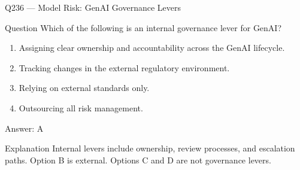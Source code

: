 \documentclass[aspectratio=169,8pt]{beamer}
\begin{document}
																																											\begin{frame}{Q236 --- Model Risk: GenAI Governance Levers}
																																												\begin{block}{Question}
																																													Which of the following is an internal governance lever for GenAI?
																																													\begin{enumerate}
																																														\item Assigning clear ownership and accountability across the GenAI lifecycle.
																																														\item Tracking changes in the external regulatory environment.
																																														\item Relying on external standards only.
																																														\item Outsourcing all risk management.
																																													\end{enumerate}  \end{block}
																																													\begin{exampleblock}{Answer: A}\end{exampleblock}
																																													\begin{block}{Explanation}
																																														Internal levers include ownership, review processes, and escalation paths. Option B is external. Options C and D are not governance levers.
																																													\end{block}
																																												\end{frame}
																																												
\end{document}
